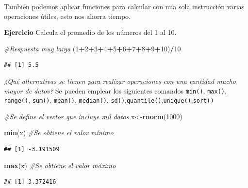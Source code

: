 \documentclass[
]{book}
\newenvironment{Shaded}{\begin{snugshade}}{\end{snugshade}}
\newcommand{\CommentTok}[1]{\textcolor[rgb]{0.56,0.35,0.01}{\textit{#1}}}
\newcommand{\DecValTok}[1]{\textcolor[rgb]{0.00,0.00,0.81}{#1}}
\newcommand{\FunctionTok}[1]{\textcolor[rgb]{0.13,0.29,0.53}{\textbf{#1}}}
\newcommand{\NormalTok}[1]{#1}
\newcommand{\OtherTok}[1]{\textcolor[rgb]{0.56,0.35,0.01}{#1}}
\newcommand{\SpecialCharTok}[1]{\textcolor[rgb]{0.81,0.36,0.00}{\textbf{#1}}}
\begin{document}
También podemos aplicar funciones para calcular con una sola instrucción varias operaciones útiles, esto nos ahorra tiempo.

\textbf{Ejercicio} Calcula el promedio de los números del 1 al 10.

\begin{Shaded}
\begin{Highlighting}[]
\CommentTok{\#Respuesta muy larga }
\NormalTok{(}\DecValTok{1}\SpecialCharTok{+}\DecValTok{2}\SpecialCharTok{+}\DecValTok{3}\SpecialCharTok{+}\DecValTok{4}\SpecialCharTok{+}\DecValTok{5}\SpecialCharTok{+}\DecValTok{6}\SpecialCharTok{+}\DecValTok{7}\SpecialCharTok{+}\DecValTok{8}\SpecialCharTok{+}\DecValTok{9}\SpecialCharTok{+}\DecValTok{10}\NormalTok{)}\SpecialCharTok{/}\DecValTok{10}
\end{Highlighting}
\end{Shaded}

\begin{verbatim}
## [1] 5.5
\end{verbatim}

\emph{¿Qué alternativas se tienen para realizar operaciones con una cantidad mucho mayor de datos?} Se pueden emplear los siguientes comandos \texttt{min()}, \texttt{max()}, \texttt{range()}, \texttt{sum()}, \texttt{mean()}, \texttt{median()}, \texttt{sd()},\texttt{quantile()},\texttt{unique()},\texttt{sort()}

\begin{Shaded}
\begin{Highlighting}[]
\CommentTok{\#Se define el vector que incluye mil datos}
\NormalTok{x}\OtherTok{\textless{}{-}}\FunctionTok{rnorm}\NormalTok{(}\DecValTok{1000}\NormalTok{)}

\FunctionTok{min}\NormalTok{(x) }\CommentTok{\#Se obtiene el valor mínimo}
\end{Highlighting}
\end{Shaded}

\begin{verbatim}
## [1] -3.191509
\end{verbatim}

\begin{Shaded}
\begin{Highlighting}[]
\FunctionTok{max}\NormalTok{(x) }\CommentTok{\#Se obtiene el valor máximo}
\end{Highlighting}
\end{Shaded}

\begin{verbatim}
## [1] 3.372416
\end{verbatim}
\end{document}
